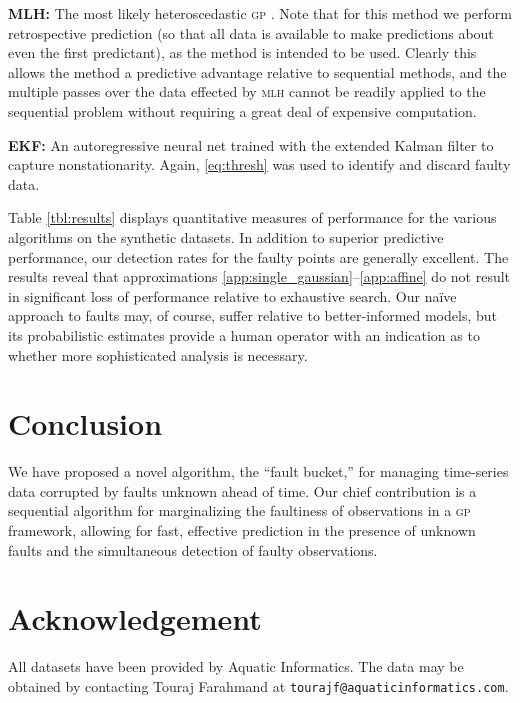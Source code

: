 \documentclass{article}
\newcommand{\acro}[1]{\textsc{#1}}
\begin{document}
{\bf MLH:} 
The most likely heteroscedastic  \acro{gp} \citep{kersting2007most}. Note that for this method we perform retrospective prediction (so that all data is available to make predictions about even the first predictant), as the method is intended to be used. Clearly this allows the method a predictive advantage relative to sequential methods, and the multiple passes over the data effected by \acro{mlh} cannot be readily applied to the sequential problem without requiring a great deal of expensive computation. 

{\bf EKF:}
An autoregressive neural net trained with the extended Kalman filter to capture nonstationarity. Again, \eqref{eq:thresh} was used to identify and discard faulty data.

Table \ref{tbl:results} displays quantitative measures of performance
for the various algorithms on the synthetic
datasets.  
In addition to superior predictive performance, our
detection rates for the faulty points are generally excellent. The results reveal that approximations \ref{app:single_gaussian}--\ref{app:affine} do not result in significant loss of performance relative to exhaustive search. Our na\"{i}ve approach to faults may, of course, suffer relative to better-informed models, but its probabilistic estimates provide a human operator with an indication as to whether more sophisticated analysis is necessary.

\section{Conclusion}
We have proposed a novel algorithm, the ``fault bucket,'' for managing
time-series data corrupted by faults unknown ahead of time. Our chief
contribution is a sequential algorithm for marginalizing the
faultiness of observations in a \acro{gp} framework, allowing for
fast, effective prediction in the presence of unknown faults and the
simultaneous detection of faulty observations.

\section*{Acknowledgement}
All datasets have been provided by Aquatic Informatics. The data may
be obtained by contacting Touraj Farahmand at
\texttt{tourajf@aquaticinformatics.com}.




\end{document}
